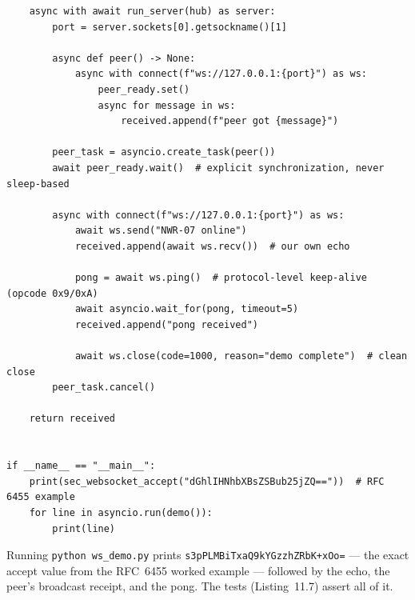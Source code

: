 \begin{verbatim}
    async with await run_server(hub) as server:
        port = server.sockets[0].getsockname()[1]

        async def peer() -> None:
            async with connect(f"ws://127.0.0.1:{port}") as ws:
                peer_ready.set()
                async for message in ws:
                    received.append(f"peer got {message}")

        peer_task = asyncio.create_task(peer())
        await peer_ready.wait()  # explicit synchronization, never sleep-based

        async with connect(f"ws://127.0.0.1:{port}") as ws:
            await ws.send("NWR-07 online")
            received.append(await ws.recv())  # our own echo

            pong = await ws.ping()  # protocol-level keep-alive (opcode 0x9/0xA)
            await asyncio.wait_for(pong, timeout=5)
            received.append("pong received")

            await ws.close(code=1000, reason="demo complete")  # clean close
        peer_task.cancel()

    return received


if __name__ == "__main__":
    print(sec_websocket_accept("dGhlIHNhbXBsZSBub25jZQ=="))  # RFC 6455 example
    for line in asyncio.run(demo()):
        print(line)
\end{verbatim}

Running \texttt{python ws\_demo.py} prints
\texttt{s3pPLMBiTxaQ9kYGzzhZRbK+xOo=} --- the exact accept value from the
RFC~6455 worked example --- followed by the echo, the peer's broadcast
receipt, and the pong. The tests (Listing~11.7) assert all of it.

